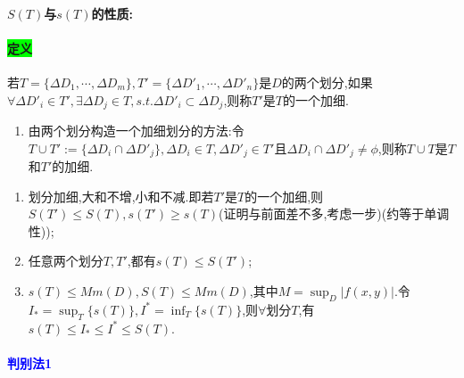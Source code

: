 \documentclass[UTF8]{ctexart}
\begin{document}
    \paragraph{$S(T)$与$s(T)$的性质:}
    \paragraph{\colorbox{lime}{定义}}若$T=\{\Delta D_1,\cdots,\Delta D_m\},T'=\{\Delta D'_1,\cdots,\Delta D'_n\}$是$D$的两个划分,如果$\forall\Delta D'_i\in T',\exists\Delta D_j\in T,s.t.\Delta D'_i\subset\Delta D_j$,则称$T'$是$T$的一个加细.

    \begin{enumerate}[$\cdot$)]
        \item 由两个划分构造一个加细划分的方法:令$T\cup T':=\{\Delta D_i\cap\Delta D'_j\},\Delta D_i\in T,\Delta D'_j\in T'$且$\Delta D_i\cap\Delta D'_j\not=\phi$,则称$T\cup T$是$T$和$T'$的加细.
    \end{enumerate}

    \begin{enumerate}[1)]
        \item 划分加细,大和不增,小和不减.即若$T'$是$T$的一个加细,则$S(T')\le S(T),s(T')\ge s(T)$(证明与前面差不多,考虑一步)(约等于单调性));
        \item 任意两个划分$T,T'$,都有$s(T)\le S(T')$;
        \item $s(T)\le Mm(D),S(T)\le Mm(D)$,其中$M=\sup_D|f(x,y)|$.令$I_*=\sup_T\{s(T)\},I^*=\inf_T\{s(T)\}$,则$\forall$划分$T$,有$s(T)\le I_*\le I^*\le S(T)$.
    \end{enumerate}

    \paragraph{\textcolor{blue}{判别法1}}
\end{document}
